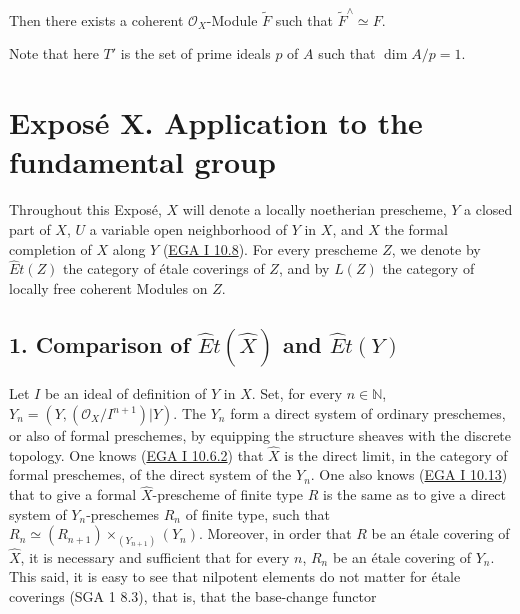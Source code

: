 \documentclass[
  11pt,
  a4paper,
]{book}
\begin{document}
Then there exists a coherent \(\mathcal{O}_{X}\)-Module \(\tilde{F}\)
such that \(\tilde{F}^{\wedge} \simeq F\).

Note that here \(T'\) is the set of prime ideals \(p\) of \(A\) such
that \(\dim A/p = 1\).

\chapter{Exposé X. Application to the fundamental
group}\label{exposuxe9-x.-application-to-the-fundamental-group}

Throughout this Exposé, \(X\) will denote a locally noetherian
prescheme, \(Y\) a closed part of \(X\), \(U\) a variable open
neighborhood of \(Y\) in \(X\), and \(\hat{X}\) the formal completion of
\(X\) along \(Y\)
(\href{https://jcreinhold.github.io/ega/i/01-10-formal-schemes.html\#108-formal-completion-of-a-prescheme-along-a-closed-subset}{EGA
I 10.8}). For every prescheme \(Z\), we denote by \(\hat{E}t(Z)\) the
category of étale coverings of \(Z\), and by \(L(Z)\) the category of
locally free coherent Modules on \(Z\).

\section{\texorpdfstring{1. Comparison of \(\hat{E}t(\hat{X})\) and
\(\hat{E}t(Y)\)}{1. Comparison of \textbackslash hat\{E\}t(\textbackslash hat\{X\}) and \textbackslash hat\{E\}t(Y)}}\label{comparison-of-hatethatx-and-hatety}

Let \(I\) be an ideal of definition of \(Y\) in \(X\). Set, for every
\(n \in \mathbb{N}\), \(Y_{n} = (Y,
(\mathcal{O}_{X}/I^{n+1})|Y)\). The \(Y_{n}\) form a direct system of
ordinary preschemes, or also of formal preschemes, by equipping the
structure sheaves with the discrete topology. One knows
(\href{https://jcreinhold.github.io/ega/i/01-10-formal-schemes.html\#106-formal-preschemes-as-inductive-limits}{EGA
I 10.6.2}) that \(\hat{X}\) is the direct limit, in the category of
formal preschemes, of the direct system of the \(Y_{n}\). One also knows
(\href{https://jcreinhold.github.io/ega/i/01-10-formal-schemes.html\#1013-morphisms-of-finite-type}{EGA
I 10.13}) that to give a formal \(\hat{X}\)-prescheme of finite type
\(R\) is the same as to give a direct system of \(Y_{n}\)-preschemes
\(R_{n}\) of finite type, such that
\(R_{n} \simeq (R_{n+1}) \times_{(Y_{n+1})} (Y_{n})\). Moreover, in
order that \(R\) be an étale covering of \(\hat{X}\), it is necessary
and sufficient that for every \(n\), \(R_{n}\) be an étale covering of
\(Y_{n}\). This said, it is easy to see that nilpotent elements do not
matter for étale coverings (SGA 1 8.3), that is, that the base-change
functor
\end{document}
